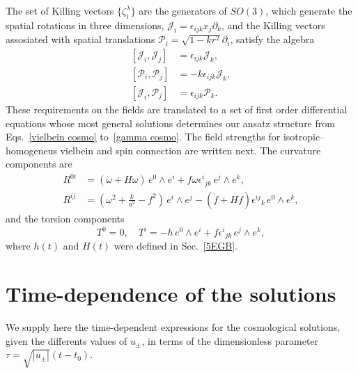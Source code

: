 \documentclass[aps,prd,12pt,superscriptaddress,showpacs,showkeys,longbibliography,reprint,nofootinbib]{revtex4-1}
\begin{document}
The set of Killing vectors $\{\zeta^\lambda_i\}$ are the generators of $SO(3)$, which generate the spatial rotations in three dimensions, $\mathcal{J}_i=\epsilon_{ijk}x_j\partial_k$, and the Killing vectors assosiated with spatial translations $\mathcal{P}_i=\sqrt{1-kr^2}\partial_i$, satisfy the algebra
\begin{align*}
  \left[\mathcal{J}_i,\mathcal{J}_j\right]&=\epsilon_{ijk}\mathcal{J}_k,\\
  \left[\mathcal{P}_i,\mathcal{P}_j\right]&=-k\epsilon_{ijk}\mathcal{J}_k,\\
  \left[\mathcal{J}_i,\mathcal{P}_j\right]&=\epsilon_{ijk}\mathcal{P}_k.
\end{align*}
These requirements on the fields are translated to a set of first order differential equations whose most general solutions determines our ansatz structure from Eqs.~\eqref{vielbein cosmo} to~\eqref{gamma cosmo}. The field strengths for isotropic--homogeneus vielbein and spin connection are written next. The curvature components are
\begin{align*}
  R^{0i}&=\left(\dot{\omega}+H\omega\right) \, e^0\wedge e^i+f\omega\epsilon^i{}_{jk} \, e^j\wedge e^k,\\
  R^{ij}&=\left(\omega^2+\tfrac{k}{a^2}-f^2\right) \, e^i\wedge e^j
  -\left(\dot{f}+Hf\right)\epsilon^{ij}{}_{k} \, e^0\wedge e^k,
\end{align*}
and the torsion components
\begin{equation}\label{homotorsion}
  T^0=0,\quad T^i=-h \, e^0\wedge e^i+f\epsilon^i{}_{jk} \, e^j\wedge e^k,
\end{equation}
where $h(t)$ and $H(t)$ were defined in Sec.~\ref{5EGB}.

\section{Time-dependence of the solutions\label{solutions t}}

We supply here the time-dependent expressions for the cosmological solutions, given the differents values of $u_\pm$, in terms of the dimensionless parameter \mbox{$\tau=\sqrt{|u_\pm|}(t-t_0)$}.
\end{document}
